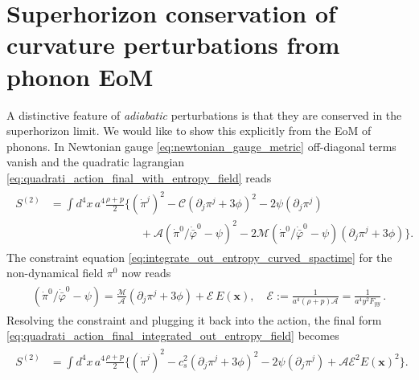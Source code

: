 \section{Superhorizon conservation of curvature perturbations from phonon EoM}
A distinctive feature of \emph{adiabatic} perturbations is that they are conserved in the superhorizon limit.
We would like to show this explicitly from the EoM of phonons.
%
In Newtonian gauge \eqref{eq:newtonian_gauge_metric} off-diagonal terms vanish and the quadratic lagrangian \eqref{eq:quadrati_action_final_with_entropy_field} reads 
{\small\begin{align}\label{eq:quadrati_action_final_with_entropy_field}
\begin{aligned}
     S^{(2)}&=\int\! d^4x\, a^4\frac{\rho+p}{2}\bigg\{
    (\dot{\pi}^j)^2 -\mathcal{C}(\partial_j \pi^j+3\phi)^2 -2\psi (\partial_j\pi^j)\\[2.5pt]
    &\qquad\qquad\qquad \qquad + \mathcal{A} (\dot{\pi}^0/\dot{\bar{\varphi}}^0-\psi)^2 - 2\mathcal{M}(\dot{\pi}^0/\dot{\bar{\varphi}}^0-\psi) (\partial_j \pi^j+3\phi) \bigg\}.
\end{aligned}
\end{align}}
The constraint equation \eqref{eq:integrate_out_entropy_curved_spactime} for the non-dynamical field $\pi^0$ now reads
{\small\begin{align}
\begin{aligned}
     (\dot{\pi}^0/\dot{\bar{\varphi}}^0-\psi) = \frac{\mathcal{M}}{\mathcal{A}}(\partial_j \pi^j+3\phi) + \mathcal{E}\,{E(\mathbf{x})},\quad \mathcal{E}:=\frac{1}{a^4(\rho+p)\mathcal{A}} = \frac{1}{a^4 y^2 F_{yy}}\,.
\end{aligned}
\end{align}}
Resolving the constraint and plugging it back into the action, the final form \eqref{eq:quadrati_action_final_integrated_out_entropy_field} becomes
{\small\begin{align}
\begin{aligned}
   S^{(2)}&=\int\! d^4x\, a^4\frac{\rho+p}{2}\bigg\{
    (\dot{\pi}^j)^2 -c_s^2(\partial_j \pi^j+3\phi)^2 -2\psi (\partial_j\pi^j) + \mathcal{A}\mathcal{E}^2 E(\mathbf{x})^2\bigg\}.
\end{aligned}
\end{align}}
